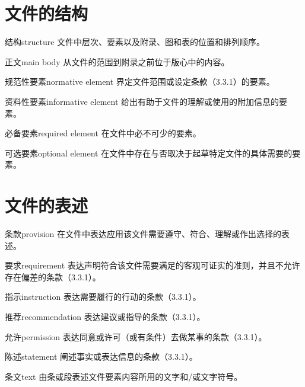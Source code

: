 \section{文件的结构}
\begin{term}[subsection]{结构}{structure}
文件中层次、要素以及附录、图和表的位置和排列顺序。
\end{term}

\begin{term}[subsection]{正文}{main body}
从文件的范围到附录之前位于版心中的内容。
\end{term}

\begin{term}[subsection]{规范性要素}{normative element}
界定文件范围或设定条款（3.3.1）的要素。
\end{term}

\begin{term}[subsection]{资料性要素}{informative element}
给出有助于文件的理解或使用的附加信息的要素。
\end{term}

\begin{term}[subsection]{必备要素}{required element}
在文件中必不可少的要素。
\end{term}

\begin{term}[subsection]{可选要素}{optional element}
在文件中存在与否取决于起草特定文件的具体需要的要素。
\end{term}

\section{文件的表述}
\begin{term}[subsection]{条款}{provision}
在文件中表达应用该文件需要遵守、符合、理解或作出选择的表述。
\end{term}

\begin{term}[subsection]{要求}{requirement}
表达声明符合该文件需要满足的客观可证实的准则，并且不允许存在偏差的条款（3.3.1）。
\end{term}

\begin{term}[subsection]{指示}{instruction}
表达需要履行的行动的条款（3.3.1）。
\end{term}

\begin{term}[subsection]{推荐}{recommendation}
表达建议或指导的条款（3.3.1）。
\end{term}

\begin{term}[subsection]{允许}{permission}
表达同意或许可（或有条件）去做某事的条款（3.3.1）。
\end{term}

\begin{term}[subsection]{陈述}{statement}
阐述事实或表达信息的条款（3.3.1）。
\end{term}

\begin{term}[subsection]{条文}{text}
由条或段表述文件要素内容所用的文字和/或文字符号。
\end{term}
